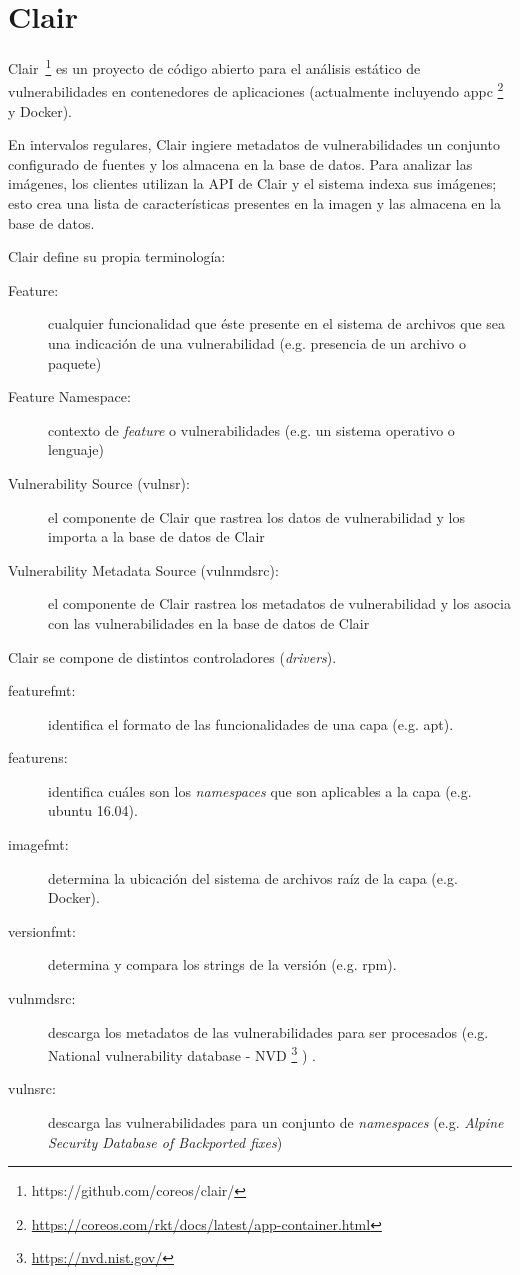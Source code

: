\section{Clair}\label{sec:clair}

Clair~\footnote{https://github.com/coreos/clair/} es un proyecto de código abierto para el análisis estático de vulnerabilidades en contenedores de aplicaciones (actualmente incluyendo appc \footnote{\url{https://coreos.com/rkt/docs/latest/app-container.html}} y Docker).
   
En intervalos regulares, Clair ingiere metadatos de vulnerabilidades un conjunto configurado de fuentes y los almacena en la base de datos. 
Para analizar las imágenes, los clientes utilizan la API de Clair y el sistema indexa sus imágenes; esto crea una lista de características presentes en la imagen y las almacena en la base de datos.

Clair define su propia terminología:

\begin{description}
	\item [Feature:] cualquier funcionalidad que éste presente en el sistema de archivos que sea una indicación de una vulnerabilidad (e.g. presencia de un archivo o paquete)
	\item [Feature Namespace:] contexto de \emph{feature} o vulnerabilidades (e.g. un sistema operativo o lenguaje)
	\item [Vulnerability Source (vulnsr):] el componente de Clair que rastrea los datos de vulnerabilidad y los importa a la base de datos de Clair
	\item [Vulnerability Metadata Source (vulnmdsrc):] el componente de Clair rastrea los metadatos de vulnerabilidad y los asocia con las vulnerabilidades en la base de datos de Clair
\end{description}

Clair se compone de distintos controladores (\emph{drivers}).

\begin{description}
	\item [featurefmt:] identifica el formato de las funcionalidades de una capa (e.g. apt).
	\item [featurens:] identifica cuáles son los \emph{namespaces} que son aplicables a la capa (e.g. ubuntu 16.04).
	\item [imagefmt:] determina la ubicación del sistema de archivos raíz de la capa (e.g. Docker).
	\item [versionfmt:] determina y compara los strings de la versión (e.g. rpm).
	\item [vulnmdsrc:] descarga los metadatos de las vulnerabilidades para ser procesados (e.g. National vulnerability database - NVD \footnote{\url{https://nvd.nist.gov/}} ) .
	\item [vulnsrc:] descarga las vulnerabilidades para un conjunto de \emph{namespaces} (e.g. \emph{Alpine Security Database of Backported fixes})
\end{description}

